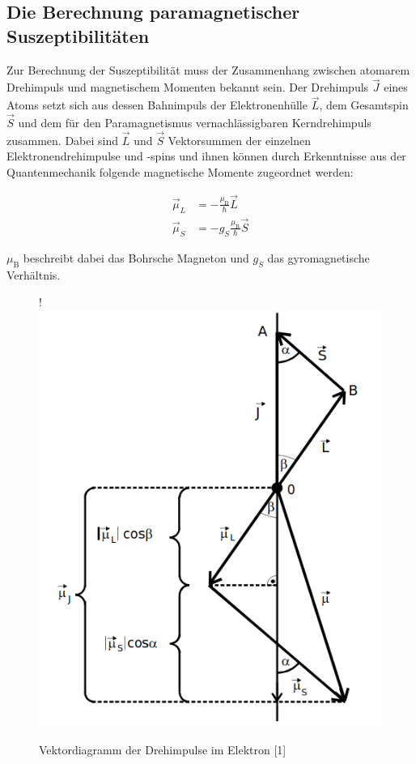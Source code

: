 \subsection{Die Berechnung paramagnetischer Suszeptibilitäten}

Zur Berechnung der Suszeptibilität muss der Zusammenhang zwischen atomarem Drehimpuls
und magnetischem Momenten bekannt sein. Der Drehimpuls $\vec{J}$ eines Atoms setzt sich
aus dessen Bahnimpuls der Elektronenhülle $\vec{L}$, dem Gesamtspin $\vec{S}$
und dem für den Paramagnetismus vernachlässigbaren Kerndrehimpuls zusammen.
Dabei sind $\vec{L}$ und $\vec{S}$ Vektorsummen der einzelnen Elektronendrehimpulse
und -spins und ihnen können durch Erkenntnisse aus der Quantenmechanik folgende
magnetische Momente zugeordnet werden:

\begin{align}
    \vec{\mu}_L &= - \frac{\mu_\text{B}}{\hbar} \vec{L} \\
    \vec{\mu}_S &= - g_S \frac{\mu_\text{B}}{\hbar} \vec{S}
\end{align}

$\mu_\text{B}$ beschreibt dabei das Bohrsche Magneton und $g_S$ das
gyromagnetische Verhältnis.

\begin{figure} [H]!
    \centering
    \includegraphics[scale=0.5]{content/bild3.png}
    \caption{Vektordiagramm der Drehimpulse im Elektron [1]}
    \label{fig:plot3}
  \end{figure}

